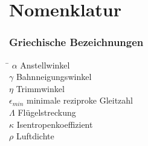 \chapter*{Nomenklatur}



\subsection*{Griechische Bezeichnungen}
\begin{tabbing}
\hspace*{2cm}\=\kill
$\alpha$ \> Anstellwinkel \\[0.2ex]
$\gamma$ \> Bahnneigungswinkel \\[0.2ex]
$\eta$ \> Trimmwinkel \\[0.2ex]
$\epsilon_{min}$ \> minimale reziproke Gleitzahl \\[0.2ex]
$\Lambda$ \> Flügelstreckung \\[0.2ex]
$\kappa$ \> Isentropenkoeffizient \\[0.2ex]
$\rho$ \> Luftdichte \\[0.2ex]
\end{tabbing}


